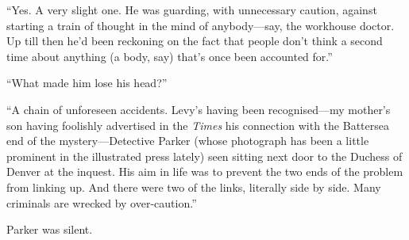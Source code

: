 \enquote{Yes. A very slight one. He was guarding, with unnecessary caution, against starting a train of thought in the mind of anybody\allowbreak---\allowbreak say, the workhouse doctor. Up till then he’d been reckoning on the fact that people don’t think a second time about anything (a body, say) that’s once been accounted for.}

\enquote{What made him lose his head?}

\enquote{A chain of unforeseen accidents. Levy’s having been recognised\allowbreak---\allowbreak my mother’s son having foolishly advertised in the \textit{Times} his connection with the Battersea end of the mystery\allowbreak---\allowbreak Detective Parker (whose photograph has been a little prominent in the illustrated press lately) seen sitting next door to the Duchess of Denver at the inquest. His aim in life was to prevent the two ends of the problem from linking up. And there were two of the links, literally side by side. Many criminals are wrecked by over-caution.}

Parker was silent.